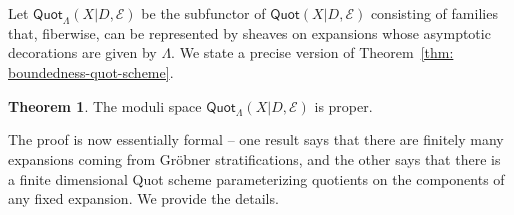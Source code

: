 \documentclass[11pt]{amsart}
\theoremstyle{definition}
\theoremstyle{definition}
\newtheorem{theorem}{Theorem}[subsection]
\begin{document}
Let $\mathsf{Quot}_\Lambda(X|D,\mathcal E)$ be the subfunctor of $\mathsf{Quot}(X|D,\mathcal E)$ consisting of families that, fiberwise, can be represented by sheaves on expansions whose asymptotic decorations are given by $\Lambda$. We state a precise version of Theorem~\ref{thm: boundedness-quot-scheme}.

\begin{theorem}
The moduli space $\mathsf{Quot}_\Lambda(X|D,\mathcal E)$ is proper. 
\end{theorem}

The proof is now essentially formal -- one result says that there are finitely many expansions coming from Gr\"obner stratifications, and the other says that there is a finite dimensional Quot scheme parameterizing quotients on the components of any fixed expansion. We provide the details.
\end{document}
